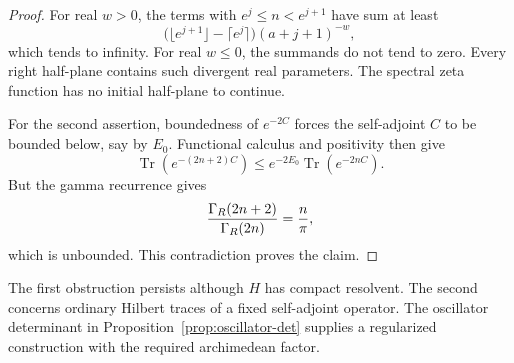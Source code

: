 \begin{proof}
For real \(w>0\), the terms with \(e^j\leq n<e^{j+1}\) have sum at
least
\[
 \bigl(\lfloor e^{j+1}\rfloor-\lceil e^j\rceil\bigr)
 (a+j+1)^{-w},
\]
which tends to infinity.  For real \(w\leq0\), the summands do not tend
to zero.  Every right half-plane contains such divergent real parameters.
The spectral zeta function has no initial half-plane to continue.

For the second assertion, boundedness of \(e^{-2C}\) forces the
self-adjoint \(C\) to be bounded below, say by \(E_0\).  Functional
calculus and positivity then give
\[
 \operatorname{Tr}(e^{-(2n+2)C})
 \leq e^{-2E_0}\operatorname{Tr}(e^{-2nC}).
\]
But the gamma recurrence gives
\[
 \frac{\Gamma_{R}(2n+2)}{\Gamma_{R}(2n)}=\frac n\pi,
\]
which is unbounded.  This contradiction proves the claim.
\end{proof}

The first obstruction persists although \(H\) has compact resolvent.
The second concerns ordinary Hilbert traces of a fixed self-adjoint
operator.  The oscillator determinant in
Proposition~\ref{prop:oscillator-det} supplies a regularized construction
with the required archimedean factor.

